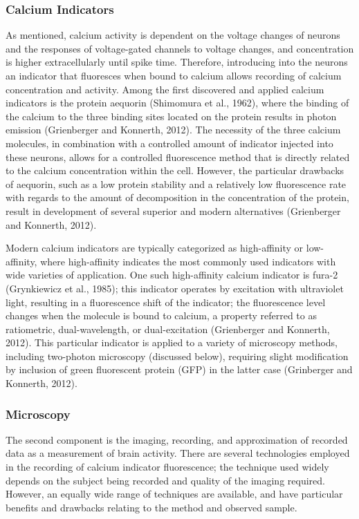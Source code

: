 \documentclass[11pt]{article}
\begin{document}
\subsubsection{Calcium Indicators}
As mentioned, calcium activity is dependent on the voltage changes of neurons and the responses of voltage-gated channels to voltage changes, and concentration is higher extracellularly until spike time. Therefore, introducing into the neurons an indicator that fluoresces when bound to calcium allows recording of calcium concentration and activity. Among the first discovered and applied calcium indicators is the protein aequorin (Shimomura et al., 1962), where the binding of the calcium to the three binding sites located on the protein results in photon emission (Grienberger and Konnerth, 2012). The necessity of the three calcium molecules, in combination with a controlled amount of indicator injected into these neurons, allows for a controlled fluorescence method that is directly related to the calcium concentration within the cell. However, the particular drawbacks of aequorin, such as a low protein stability and a relatively low fluorescence rate with regards to the amount of decomposition in the concentration of the protein, result in development of several superior and modern alternatives (Grienberger and Konnerth, 2012).\par

Modern calcium indicators are typically categorized as high-affinity or low-affinity, where high-affinity indicates the most commonly used indicators with wide varieties of application. One such high-affinity calcium indicator is fura-2 (Grynkiewicz et al., 1985); this indicator operates by excitation with ultraviolet light, resulting in a fluorescence shift of the indicator; the fluorescence level changes when the molecule is bound to calcium, a property referred to as ratiometric, dual-wavelength, or dual-excitation (Grienberger and Konnerth, 2012). This particular indicator is applied to a variety of microscopy methods, including two-photon microscopy (discussed below), requiring slight modification by inclusion of green fluorescent protein (GFP) in the latter case (Grinberger and Konnerth, 2012). 

\subsubsection{Microscopy}
The second component is the imaging, recording, and approximation of recorded data as a measurement of brain activity. There are several technologies employed in the recording of calcium indicator fluorescence; the technique used widely depends on the subject being recorded and quality of the imaging required. However, an equally wide range of techniques are available, and have particular benefits and drawbacks relating to the method and observed sample.\par
\end{document}
